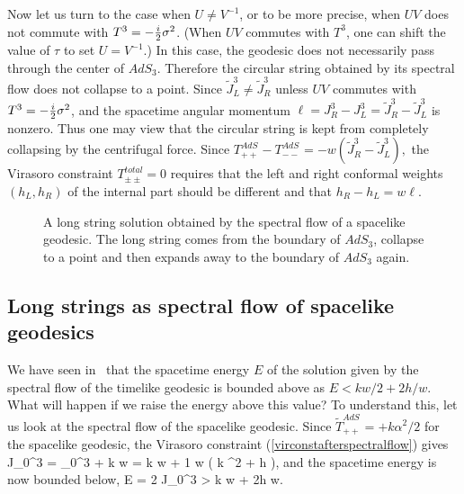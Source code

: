 Now let us turn to the case when $U \neq V^{-1}$, or to be more 
precise,
when $U V$ does not commute with $T^3 = -{i \over 2} \sigma^2$.
(When $UV$ commutes with $T^3$, one can shift the value of 
$\tau$ to set $U = V^{-1}$.) In this case,  
the geodesic does not necessarily pass through the center
of $AdS_3$. Therefore the circular string obtained by its spectral
flow does not collapse to a point.  Since
$\tilde J_L^3 \neq \tilde J_R^3$ 
unless $UV$ commutes with $T^3=-{i \over 2} \sigma^2$,
and the spacetime angular momentum
$ \ell = J_R^3 - J_L^3 = \tilde{J}_R^3 - \tilde{J}_L^3$
is nonzero. Thus one may view that the
circular string is kept from completely
collapsing by the centrifugal force. 
Since $T^{AdS}_{++} - T^{AdS}_{--} =  -w ( \tilde{J}_R^3
- \tilde{J}_L^3),$ the Virasoro constraint
$T_{\pm\pm}^{total}=0$ requires that the left and right
conformal weights $(h_L, h_R)$ of the internal part should
be different and that $h_R - h_L = w \ell  $.  

\begin{figure}[htb]
\begin{center}
\epsfxsize=1.7in\leavevmode{}
\end{center}
\caption{A long string solution obtained by the spectral
flow of a spacelike geodesic. 
 The long string comes from the boundary 
of $AdS_3$, collapse to a point and then expands away to
the boundary of $AdS_3$ again.}
\label{CF2}
\end{figure} 



\subsection{Long strings as spectral flow of spacelike geodesics}

We have seen in \higherboundforshortstring\ 
that the spacetime energy $E$ of 
the solution given by the spectral flow of
the timelike geodesic is bounded above
as $E < kw/2 + 2h / w$. What will happen
if we raise the energy above this value?
To understand this, let us look at the spectral
flow of the spacelike geodesic. Since $\tilde{T}_{++}^{AdS} = 
+ k \alpha^2/2$ for the spacelike
geodesic, the Virasoro constraint (\ref{virconstafterspectralflow})
gives
{ J_0^3 = _0^3 + {k } w =
 {k } w + {1 \over w} \left( {k } \alpha^2 + h \right),}
and the spacetime energy is now bounded  below,
{E = 2 J_0^3 > {k } w + {2h \over w}.}

